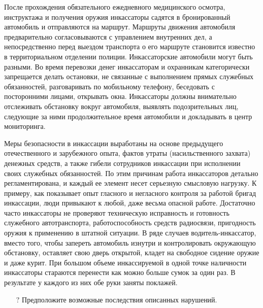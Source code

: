 \documentclass[a4paper,12pt,fleqn]{article} %
\begin{document}
После прохождения обязательного ежедневного медицинского осмотра, инструктажа и получения оружия инкассаторы садятся в бронированный автомобиль и отправляются на маршрут. Маршруты движения автомобиля предварительно согласовываются с управлением внутренних дел, а непосредственно перед выездом транспорта о его маршруте становится известно в территориальном отделении полиции. Инкассаторские автомобили могут быть разными. Во время перевозки денег инкассаторам и охранникам категорически запрещается делать остановки, не связанные с выполнением прямых служебных обязанностей, разговаривать по мобильному телефону, беседовать с посторонними лицами, открывать окна. Инкассаторы должны внимательно отслеживать обстановку вокруг автомобиля, выявлять подозрительных лиц, следующие за ними продолжительное время автомобили и докладывать в центр мониторинга.\\

\begin{tcolorbox}[colback=blue!55!red!5!,colframe=blue!55!red,enforce breakable,%
	pad at break=1mm, title=Кейс 34. Опасные типовые нарушения в инкассации]
	
	Меры безопасности в инкассации выработаны на основе предыдущего отечественного и зарубежного опыта, фактов утраты (насильственного захвата) денежных средств, а также гибели сотрудников инкассации при исполнении своих служебных обязанностей. По этим причинам работа инкассаторов детально регламентирована, и каждый ее элемент несет серьезную смысловую нагрузку. К примеру, как показывает опыт гласного и негласного контроля за работой бригад инкассации, люди привыкают к любой, даже весьма опасной работе. Достаточно часто инкассаторы не проверяют техническую исправность и готовность служебного автотранспорта, работоспособность средств радиосвязи, пригодность оружия к применению в штатной ситуации. В ряде случаев водитель-инкассатор, вместо того, чтобы запереть автомобиль изнутри и контролировать окружающую обстановку, оставляет свою дверь открытой, кладет на свободное сидение оружие и даже курит. При большом объеме инкассируемой в одной точке наличности инкассаторы стараются перенести как можно больше сумок за один раз. В результате у каждого из них обе руки заняты поклажей. 
	
	\begin{itemize}
		\item[{\color{blue!55!red}\Huge {  $ ? $}} \quad]   Предположите возможные последствия описанных нарушений.
	\end{itemize}	
	
\end{tcolorbox}
\end{document}
